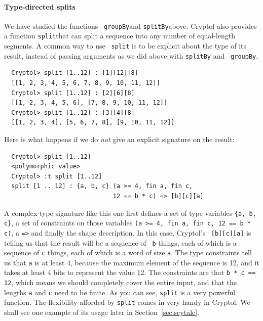 \paragraph*{Type-directed splits} We have studied the functions {\tt
  groupBy}\indGroup and {\tt splitBy}\indSplit above.  Cryptol also
provides a function {\tt split}\indSplit that can split a sequence
into any number of equal-length segments.  A common way to use {\tt
  split} is to be explicit about the type of its result, instead of
passing arguments as we did above with {\tt splitBy} and {\tt
  groupBy}.
\begin{Verbatim}
  Cryptol> split [1..12] : [1][12][8]
  [[1, 2, 3, 4, 5, 6, 7, 8, 9, 10, 11, 12]]
  Cryptol> split [1..12] : [2][6][8]
  [[1, 2, 3, 4, 5, 6], [7, 8, 9, 10, 11, 12]]
  Cryptol> split [1..12] : [3][4][8]
  [[1, 2, 3, 4], [5, 6, 7, 8], [9, 10, 11, 12]]
\end{Verbatim}
Here is what happens if we do {\em not} give an explicit signature on
the result:\indSignature
\begin{Verbatim}
  Cryptol> split [1..12]
  <polymorphic value>
  Cryptol> :t split [1..12]
  split [1 .. 12] : {a, b, c} (a >= 4, fin a, fin c,
                              12 == b * c) => [b][c][a]
\end{Verbatim}

A complex type signature like this one first defines a set of type
variables {\tt \Verb|{a, b, c}|}, a set of constraints on those
variables {\tt \Verb|(a >= 4, fin a, fin c, 12 == b * c)|}, a {\tt =>}
and finally the shape description.  In this case, Cryptol's {\tt
  [b][c][a]} is telling us that the result will be a sequence of {\tt
  b} things, each of which is a sequence of {\tt c} things, each of
which is a word of size {\tt a}. The type constraints tell us that
{\tt a} is at least 4, because the maximum element of the sequence is 12,
and it takes at least 4 bits to represent the value 12.  The
constraints are that {\tt b * c == 12}, which means we should
completely cover the entire input, and that the lengths {\tt a} and
{\tt c} need to be finite.  As you can see, {\tt split} is a very
powerful function. The flexibility afforded by {\tt split} comes in
very handy in Cryptol.  We shall see one example of its usage later in
Section~\ref{sec:scytale}.

